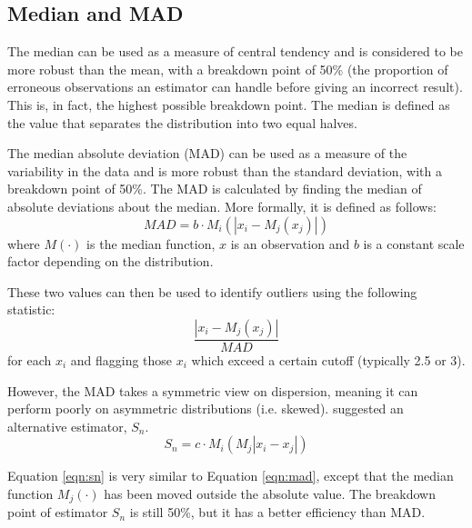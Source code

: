 \documentclass[11pt]{report}
\begin{document}
\subsection{Median and MAD} \label{mad}

The median can be used as a measure of central tendency and is considered to be more robust than the mean, with a breakdown point of 50\% (the proportion of erroneous observations an estimator can handle before giving an incorrect result). This is, in fact, the highest possible breakdown point. The median is defined as the value that separates the distribution into two equal halves.

The median absolute deviation (MAD) can be used as a measure of the variability in the data and is more robust than the standard deviation, with a breakdown point of 50\%. The MAD is calculated by finding the median of absolute deviations about the median. More formally, it is defined as follows:
\begin{equation}
MAD = b \cdot M_i (| x_i - M_j (x_j) |)
\end{equation}
where $M(\cdot)$ is the median function, $x$ is an observation and $b$ is a constant scale factor depending on the distribution.


These two values can then be used to identify outliers using the following statistic:
\begin{equation} \label{eqn:mad}
\frac{| x_i - M_j(x_j) |}{MAD}
\end{equation}
for each $x_i$ and flagging those $x_i$ which exceed a certain cutoff (typically 2.5 or 3).


However, the MAD takes a symmetric view on dispersion, meaning it can perform poorly on asymmetric distributions (i.e. skewed). \cite{rousseeuw1993alternatives} suggested an alternative estimator, $S_n$.
\begin{equation} \label{eqn:sn}
S_n = c \cdot M_i ( M_j | x_i - x_j | )
\end{equation}

Equation \ref{eqn:sn} is very similar to Equation \ref{eqn:mad}, except that the median function $M_j(\cdot)$ has been moved outside the absolute value. The breakdown point of estimator $S_n$ is still 50\%, but it has a better efficiency than MAD.
\end{document}
